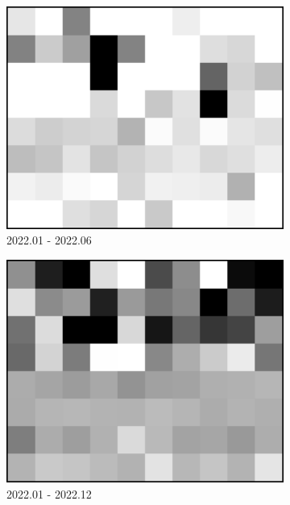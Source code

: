\documentclass[preprint, authoryear]{elsarticle}
\begin{document}
\begin{figure}
\begin{subfigure}{0.3\textwidth}
        \centering
        \includegraphics[width=\textwidth]{figure/The azimuth shift/shift_Milan_des_20220630.png}
        \caption{2022.01 - 2022.06}
        \label{fig_7d}
    \end{subfigure}
    \begin{subfigure}{0.3\textwidth}
        \centering
        \includegraphics[width=\textwidth]{figure/The azimuth shift/shift_Milan_des_20221227.png}
        \caption{2022.01 - 2022.12}
        \label{fig_7e}
    \end{subfigure}
    \begin{subfigure}{0.3\textwidth}

\end{subfigure}
\end{figure}
\end{document}
